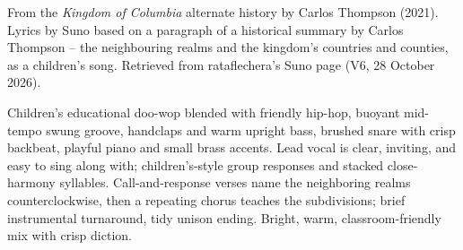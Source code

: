 
\begin{notes}
From the \emph{Kingdom of Columbia} alternate history by Carlos Thompson (2021). Lyrics by Suno based on a paragraph of a historical summary by Carlos Thompson -- the neighbouring realms and the kingdom's countries and counties, as a children's song. Retrieved from rataflechera's Suno page (V6, 28 October 2026).
\end{notes}
\begin{style}
Children’s educational doo-wop blended with friendly hip-hop, buoyant mid-tempo swung groove, handclaps and warm upright bass, brushed snare with crisp backbeat, playful piano and small brass accents. Lead vocal is clear, inviting, and easy to sing along with; children’s-style group responses and stacked close-harmony syllables. Call-and-response verses name the neighboring realms counterclockwise, then a repeating chorus teaches the subdivisions; brief instrumental turnaround, tidy unison ending. Bright, warm, classroom-friendly mix with crisp diction.
\end{style}
